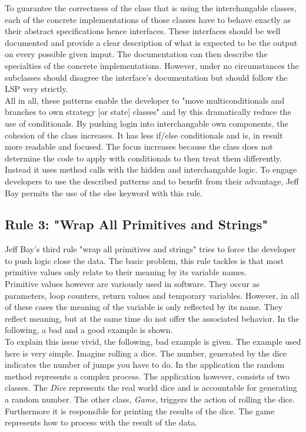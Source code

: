  To guarantee the correctness of the class that is using the interchangable classes, each of the concrete implementations of those classes have to behave exactly as their abstract specifications hence interfaces. These interfaces should be well documented and provide a clear description of what is expected to be the output on every possible given imput. The documentation can then describe the specialties of the concrete implementations. However, under no circumstances the subclasses should disagree the interface's documentation but should follow the \ac{LSP} very strictly. \\

 All in all, these patterns enable the developer to "move multiconditionals and branches to own strategy [or state] classes" \cite{gof} and by this dramatically reduce the use of conditionals. By pushing login into interchangable own components, the cohesion of the class increases. It has less if/else conditionals and is, in result more readable and focused. The focus increases because the class does not determine the code to apply with conditionals to then treat them differently. Instead it uses method calls with the hidden and interchangable logic. To engage developers to use the described patterns and to benefit from their advantage, Jeff Bay permits the use of the else keyword with this rule. 

\subsection*{Rule 3: "Wrap All Primitives and Strings"}
Jeff Bay's third rule "wrap all primitives and strings" tries to force the developer to push logic close the data. The basic problem, this rule tackles is that most primitive values only relate to their meaning by its variable names. \\

Primitive values however are variously used in software. They occur as parameters, loop counters, return values and temporary variables. However, in all of these cases the meaning of the variable is only reflected by its name. They reflect meaning, but at the same time do not offer the associated behavior. In the following, a bad and a good example is shown. \\

To explain this issue vivid, the following, bad example is given. The example used here is very simple. Imagine rolling a dice. The number, generated by the dice indicates the number of jumps you have to do. In the application the random method represents a complex process. The application however, consists of two classes. The \textit{Dice} represents the real world dice and is accountable for generating a random number. The other class, \textit{Game}, triggers the action of rolling the dice. Furthermore it is responsible for printing the results of the dice. The game represents how to process with the result of the data.   \\


